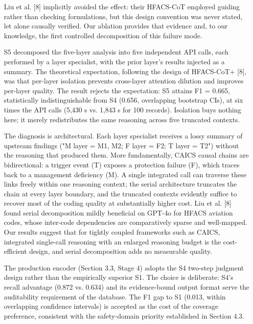 \documentclass[11pt]{article}
\begin{document}
Liu et al. [8] implicitly avoided the effect: their HFACS-CoT employed guiding rather than checking formulations, but this design convention was never stated, let alone causally verified. Our ablation provides that evidence and, to our knowledge, the first controlled decomposition of this failure mode.

S5 decomposed the five-layer analysis into five independent API calls, each performed by a layer specialist, with the prior layer's results injected as a summary. The theoretical expectation, following the design of HFACS-CoT+ [8], was that per-layer isolation prevents cross-layer attention dilution and improves per-layer quality. The result rejects the expectation: S5 attains F1 = 0.665, statistically indistinguishable from S4 (0.656, overlapping bootstrap CIs), at six times the API calls (5,430 s vs. 1,843 s for 100 records). Isolation buys nothing here; it merely redistributes the same reasoning across five truncated contexts.

The diagnosis is architectural. Each layer specialist receives a lossy summary of upstream findings ("M layer = M1, M2; F layer = F2; T layer = T2") without the reasoning that produced them. More fundamentally, CAICS causal chains are bidirectional: a trigger event (T) exposes a protection failure (F), which traces back to a management deficiency (M). A single integrated call can traverse these links freely within one reasoning context; the serial architecture truncates the chain at every layer boundary, and the truncated contexts evidently suffice to recover most of the coding quality at substantially higher cost. Liu et al. [8] found serial decomposition mildly beneficial on GPT-4o for HFACS aviation codes, whose inter-code dependencies are comparatively sparse and well-mapped. Our results suggest that for tightly coupled frameworks such as CAICS, integrated single-call reasoning with an enlarged reasoning budget is the cost-efficient design, and serial decomposition adds no measurable quality.

The production encoder (Section 3.3, Stage 4) adopts the S4 two-step judgment design rather than the empirically superior S1. The choice is deliberate: S4's recall advantage (0.872 vs. 0.634) and its evidence-bound output format serve the auditability requirement of the database. The F1 gap to S1 (0.013, within overlapping confidence intervals) is accepted as the cost of the coverage preference, consistent with the safety-domain priority established in Section 4.3.
\end{document}
